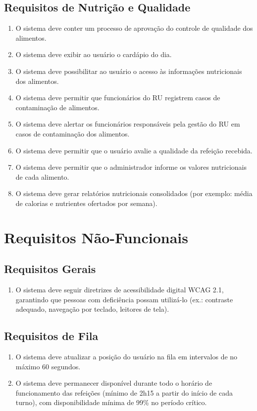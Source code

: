 \documentclass[12pt,a4paper]{article}
\begin{document}
\subsection{Requisitos de Nutrição e Qualidade}
\begin{enumerate}[label=\textbf{RF-NUT-\arabic*}, leftmargin=*, align=left]
    \item O sistema deve conter um processo de aprovação do controle de qualidade dos alimentos.
    \item O sistema deve exibir ao usuário o cardápio do dia.
    \item O sistema deve possibilitar ao usuário o acesso às informações nutricionais dos alimentos.
    \item O sistema deve permitir que funcionários do RU registrem casos de contaminação de alimentos.
    \item O sistema deve alertar os funcionários responsáveis pela gestão do RU em casos de contaminação dos alimentos.
    \item O sistema deve permitir que o usuário avalie a qualidade da refeição recebida.
    \item O sistema deve permitir que o administrador informe os valores nutricionais de cada alimento.
    \item O sistema deve gerar relatórios nutricionais consolidados (por exemplo: média de calorias e nutrientes ofertados por semana).
\end{enumerate}

\section{Requisitos Não-Funcionais}

\subsection{Requisitos Gerais}
\begin{enumerate}[label=\textbf{RNF-GEN-\arabic*}, leftmargin=*, align=left]
    \item O sistema deve seguir diretrizes de acessibilidade digital WCAG 2.1, garantindo que pessoas com deficiência possam utilizá-lo (ex.: contraste adequado, navegação por teclado, leitores de tela).
\end{enumerate}

\subsection{Requisitos de Fila}
\begin{enumerate}[label=\textbf{RNF-FIL-\arabic*}, leftmargin=*, align=left]
    \item O sistema deve atualizar a posição do usuário na fila em intervalos de no máximo 60 segundos.
    \item O sistema deve permanecer disponível durante todo o horário de funcionamento das refeições (mínimo de 2h15 a partir do início de cada turno), com disponibilidade mínima de 99\% no período crítico.
\end{enumerate}
\end{document}
